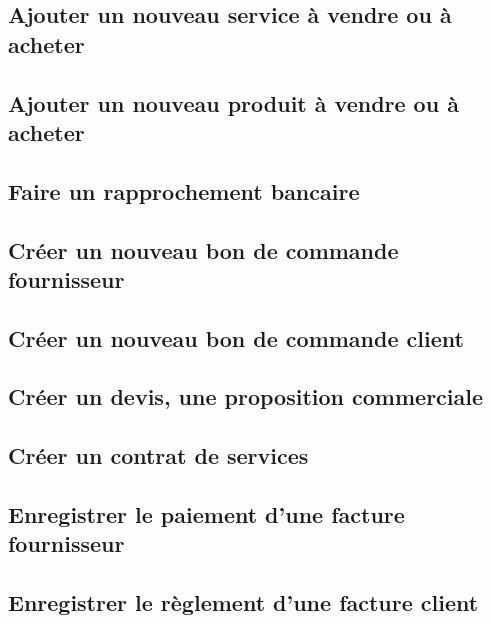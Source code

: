 \documentclass[a4paper]{article}
\begin{document}
\subsection{Ajouter un nouveau service à vendre ou à acheter}
\label{sec:DolibarrNouveauService}

\subsection{Ajouter un nouveau produit à vendre ou à acheter}
\label{sec:DolibarrNouveauProduit}

\subsection{Faire un rapprochement bancaire}
\label{sec:DolibarrBanqueRapprochement}

\subsection{Créer un nouveau bon de commande fournisseur}
\label{sec:DolibarrCommandeFournisseur}

\subsection{Créer un nouveau bon de commande client}
\label{sec:DolibarrCommandeClient}

\subsection{Créer un devis, une proposition commerciale}
\label{sec:DolibarrDevisPropal}

\subsection{Créer un contrat de services}
\label{sec:DolibarrContratServices}

\subsection{Enregistrer le paiement d'une facture fournisseur}
\label{sec:DolibarrPaiementFactureFournisseur}

\subsection{Enregistrer le règlement d'une facture client}
\label{sec:DolibarrPaiementFactureClient}
\end{document}

